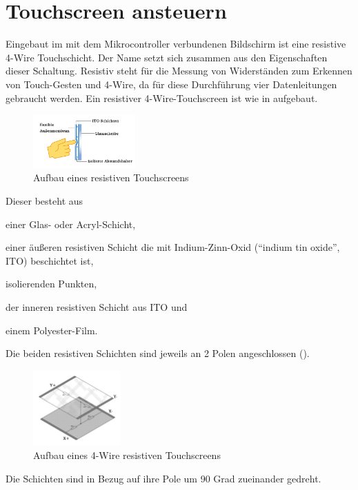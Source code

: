 \section{\ExercisePrefixEmbeddedC Touchscreen ansteuern \optional}
Eingebaut im mit dem Mikrocontroller verbundenen Bildschirm ist eine resistive 4-Wire Touchschicht.
Der Name setzt sich zusammen aus den Eigenschaften dieser Schaltung.
Resistiv steht für die Messung von Widerständen zum Erkennen von Touch-Gesten und 4-Wire, da für diese Durchführung vier Datenleitungen gebraucht werden.
Ein resistiver 4-Wire-Touchscreen ist wie in  aufgebaut.
%
\begin{figure}[htbp]
    \centering
    \includegraphics[width=0.35\textwidth]{./05_c/figures/4WireRSTouch.png}
    \caption{Aufbau eines resistiven Touchscreens}
    \label{fig:rsTouch}
\end{figure}
%
Dieser besteht aus
\begin{inparaenum}
\item
einer Glas- oder Acryl-Schicht,
\item 
einer äußeren resistiven Schicht die mit Indium-Zinn-Oxid (\enquote{indium tin oxide}, ITO) beschichtet ist,
\item 
isolierenden Punkten,
\item 
der inneren resistiven Schicht aus ITO und 
\item
einem Polyester-Film.
\end{inparaenum}
Die beiden resistiven Schichten sind jeweils an 2 Polen angeschlossen ().
%
\begin{figure}[htbp]
    \centering
    \includegraphics[width=0.3\textwidth]{./05_c/figures/ResistiveTS.png}
    \caption{Aufbau eines 4-Wire resistiven Touchscreens }
    \label{fig:fourRSTouch}
\end{figure} 
%
Die Schichten sind in Bezug auf ihre Pole um 90 Grad zueinander gedreht.
